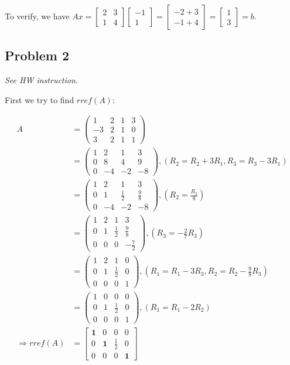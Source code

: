 \documentclass[11pt]{article}
\providecommand{\qbm}[1]{\begin{bmatrix} #1 \end{bmatrix}}
\begin{document}
\noindent To verify, we have $Ax = \qbm{2 & 3 \\ 1 & 4} \qbm{-1 \\ 1} = \qbm{ -2 + 3 \\ -1 + 4} = \qbm{1 \\ 3} = b$.

\subsection*{Problem 2}
\textit{See HW instruction.}\newline

First we try to find $rref(A)$:

\begin{align*}
    A&=\begin{pmatrix}1&2&1&3\\-3&2&1&0\\3&2&1&1\end{pmatrix} \\
    &=\begin{pmatrix}1&2&1&3\\0&8&4&9\\0&-4&-2&-8\end{pmatrix}, (R_2=R_2+3R_1, R_3=R_3-3R_1) \\
    &=\begin{pmatrix}1&2&1&3\\0&1&\frac{1}{2}&\frac{9}{8}\\0&-4&-2&-8\end{pmatrix}, (R_2=\frac{R_2}{8}) \\
    &=\begin{pmatrix}1&2&1&3\\0&1&\frac{1}{2}&\frac{9}{8}\\0&0&0&-\frac{7}{2}\end{pmatrix}, (R_3=-\frac{2}{7}R_3) \\
    &=\begin{pmatrix}1&2&1&0\\0&1&\frac{1}{2}&0\\0&0&0&1\end{pmatrix}, (R_1=R_1-3R_3, R_2=R_2-\frac{9}{8}R_3) \\
    &=\begin{pmatrix}1&0&0&0\\0&1&\frac{1}{2}&0\\0&0&0&1\end{pmatrix}, (R_1=R_1-2R_2) \\
    \Longrightarrow rref(A) &= \qbm{\mathbf{1} & 0 & 0 & 0 \\ 0 & \mathbf{1} & \frac{1}{2} & 0 \\ 0 & 0 & 0 & \mathbf{1}}
\end{align*}
\end{document}
